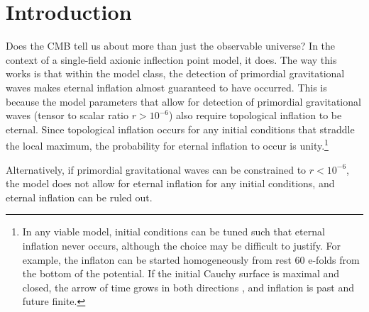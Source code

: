 \documentclass[aps,amsfonts,amsmath,prd,preprint,nofootinbib,superscriptaddress]{revtex4}
\begin{document}
\begin{abstract}
\end{abstract}

\maketitle
\tableofcontents




\section{Introduction}


Does the CMB tell us about more than just the observable universe?  In the context of a single-field axionic inflection point model, it does.  
The way this works is that within the model class, the detection of primordial gravitational waves makes eternal inflation almost
guaranteed to have occurred.  This is because the model parameters that allow for detection of primordial gravitational waves (tensor to scalar ratio $r > 10^{-6}$) 
also require topological inflation to be eternal.  Since topological inflation occurs for any initial conditions that straddle the local maximum, the probability
for eternal inflation to occur is unity.\footnote{In any viable model, initial conditions can be tuned such that eternal inflation never occurs, although the choice may be 
difficult to justify.  For example, the inflaton can be started homogeneously from rest 60 e-folds from the bottom
of the potential.  If the initial Cauchy surface is maximal and closed, the arrow of time grows in both directions \cite{Aguirre:2007gy}, and inflation is 
past and future finite.}


Alternatively, if primordial gravitational waves can be constrained to $r < 10^{-6}$, the model does not allow for eternal inflation for any initial conditions,
and eternal inflation can be ruled out.  
\end{document}
